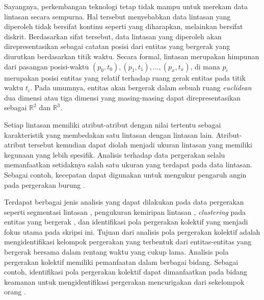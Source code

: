 Sayangnya, perkembangan teknologi tetap tidak mampu untuk merekam data lintasan secara sempurna. Hal tersebut menyebabkan data lintasan yang diperoleh tidak bersifat kontinu seperti yang diharapkan, melainkan bersifat diskrit. Berdasarkan sifat tersebut, data lintasan yang diperoleh akan direpresentasikan sebagai catatan posisi dari entitas yang bergerak yang diurutkan berdasarkan titik waktu. Secara formal, lintasan merupakan himpunan dari pasangan posisi-waktu $(p_0, t_0), (p_1, t_1), \ldots, (p_x, t_x)$, di mana $p_i$ merupakan posisi entitas yang relatif terhadap ruang gerak entitas pada titik waktu $t_i$. Pada umumnya, entitas akan bergerak dalam sebuah ruang \textit{euclidean} dua dimensi atau tiga dimensi yang masing-masing dapat direpresentasikan sebagai 
$\mathbb{R}^2$ dan $\mathbb{R}^3$. \iffalse \lionov{disebut di sini bahwa ruang gerak biasanya R2 atau R3}. \fi

Setiap lintasan memiliki atribut-atribut dengan nilai tertentu sebagai karakteristik yang membedakan satu lintasan dengan lintasan lain. Atribut-atribut tersebut kemudian dapat diolah menjadi ukuran lintasan yang memiliki kegunaan yang lebih spesifik. Analisis terhadap data pergerakan selalu memanfaatkan setidaknya salah satu ukuran yang terdapat pada data lintasan. Sebagai contoh, kecepatan dapat digunakan untuk mengukur pengaruh angin pada pergerakan burung \cite{safi:speed}.

\iffalse \lionov{jadiin paragraf baru, kan ini beda topik} \fi

Terdapat berbagai jenis analisis yang dapat dilakukan pada data pergerakan seperti segmentasi lintasan \cite{mann:01:segmentation}, pengukuran kemiripan lintasan \cite{rote:01:hausdorff, alt:01:frechet, muller:dtw}, \textit{clustering} pada entitas yang bergerak \cite{lee:01:clustering}, dan identifikasi pola pergerakan kolektif yang menjadi fokus utama pada skripsi ini. Tujuan dari analisis pola pergerakan kolektif adalah mengidentifikasi kelompok pergerakan yang terbentuk dari entitas-entitas yang bergerak bersama dalam rentang waktu yang cukup lama. Analisis pola pergerakan kolektif memiliki pemanfaatan dalam berbagai bidang. Sebagai contoh, identifikasi pola pergerakan kolektif dapat dimanfaatkan pada bidang keamanan untuk mengidentifikasi pergerakan mencurigakan dari sekelompok orang \cite{makris:01:security}.

\iffalse 

\lionov{sebaiknya ada ilustrasi kayak Figure 1.7 di thesis, buat memperjelas apa itu pergerakan kolektif} \cristopher{sedang digambar}.
\fi

